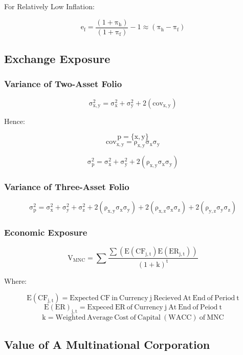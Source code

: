 \documentclass[11pt, english]{article}
\begin{document}
	\begin{center}For Relatively Low Inflation:\end{center}
	$$\mathrm{e_f=\frac{(1+\pi_h)}{(1+\pi_f)}-1\approx(\pi_h-\pi_f)}$$

\newpage

	\subsection{Exchange Exposure}

		\subsubsection{Variance of Two-Asset Folio}

	$$\mathrm{\sigma_{x,y}^2=\sigma_x^2+\sigma_y^2+2(cov_{x,y})}$$

	\begin{center}Hence:\end{center}
	$$\mathrm{p=\{x,y\}}$$
	$$\mathrm{cov_{x,y}=\rho_{x,y}\sigma_x\sigma_y}$$

	$$\mathrm{\sigma_p^2=\sigma_x^2+\sigma_y^2+2(\rho_{x,y}\sigma_x\sigma_y)}$$

		\subsubsection{Variance of Three-Asset Folio}

	$$\mathrm{\sigma_p^2=\sigma_x^2+\sigma_y^2+\sigma_z^2+2(\rho_{x,y}\sigma_x\sigma_y)+2(\rho_{x,z}\sigma_x\sigma_z)+2(\rho_{y,z}\sigma_y\sigma_z)}$$

		\subsubsection{Economic Exposure}

	$$\mathrm{V_{MNC}=\sum\frac{\sum(E(CF_{j,t})E(ER_{j,t}))}{(1+k)^t}}$$

	\begin{center}Where:\end{center}
	$$\mathrm{E(CF_{j,t})=Expected\ CF\ in\ Currency\ j\ Recieved\ At\ End\ of\ Period\ t}$$
	$$\mathrm{E(ER)_{j,t}=Expeced\ ER\ of\ Currency\ j\ At\ End\ of\ Peiod\ t}$$
	$$\mathrm{k=Weighted\ Average\ Cost\ of\ Capital\ (WACC)\ of\ MNC}$$

\newpage

	\subsection{Value of A Multinational Corporation}
\end{document}
